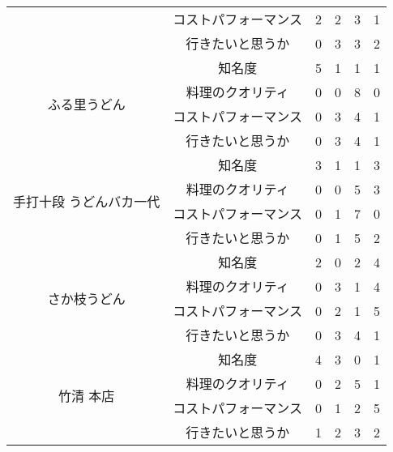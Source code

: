 \begin{table}[H]
\begin{tabular}{|c|c|r|r|r|r|}
 & コストパフォーマンス & 2 & 2 & 3 & 1 \\ \cline{2-6}
 & 行きたいと思うか & 0 & 3 & 3 & 2 \\ \hline
\multirow{4}{*}{ふる里うどん} & 知名度 & 5 & 1 & 1 & 1 \\ \cline{2-6}
 & 料理のクオリティ & 0 & 0 & 8 & 0 \\ \cline{2-6}
 & コストパフォーマンス & 0 & 3 & 4 & 1 \\ \cline{2-6}
 & 行きたいと思うか & 0 & 3 & 4 & 1 \\ \hline
\multirow{4}{*}{手打十段 うどんバカ一代} & 知名度 & 3 & 1 & 1 & 3 \\ \cline{2-6}
 & 料理のクオリティ & 0 & 0 & 5 & 3 \\ \cline{2-6}
 & コストパフォーマンス & 0 & 1 & 7 & 0 \\ \cline{2-6}
 & 行きたいと思うか & 0 & 1 & 5 & 2 \\ \hline
\multirow{4}{*}{さか枝うどん} & 知名度 & 2 & 0 & 2 & 4 \\ \cline{2-6}
 & 料理のクオリティ & 0 & 3 & 1 & 4 \\ \cline{2-6}
 & コストパフォーマンス & 0 & 2 & 1 & 5 \\ \cline{2-6}
 & 行きたいと思うか & 0 & 3 & 4 & 1 \\ \hline
\multirow{4}{*}{竹清 本店} & 知名度 & 4 & 3 & 0 & 1 \\ \cline{2-6}
 & 料理のクオリティ & 0 & 2 & 5 & 1 \\ \cline{2-6}
 & コストパフォーマンス & 0 & 1 & 2 & 5 \\ \cline{2-6}
 & 行きたいと思うか & 1 & 2 & 3 & 2 \\ \hline
\end{tabular}
\end{table}

